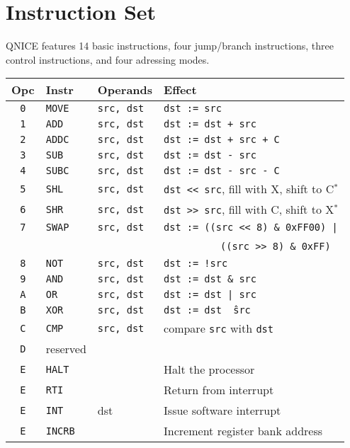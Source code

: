 \documentclass{leaflet}
\begin{document}
 \section{Instruction Set}
  QNICE features 14 basic instructions, four jump/branch instructions, three
  control instructions, and four adressing modes.
  \vspace*{-3mm}
  {\scriptsize
   \begin{center}
    \begin{longtable}{|c|ll|l|}
     \hline
      $\!\!\!$Opc$\!\!\!$&Instr&Operands&Effect\\
     \hline
     \hline
      {\tt 0}&{\tt MOVE}&{\tt src, dst}&{\tt dst := src}\\
      {\tt 1}&{\tt ADD}&{\tt src, dst}&{\tt dst := dst + src}\\
      {\tt 2}&{\tt ADDC}&{\tt src, dst}&{\tt dst := dst + src + C}\\
      {\tt 3}&{\tt SUB}&{\tt src, dst}&{\tt dst := dst - src}\\
      {\tt 4}&{\tt SUBC}&{\tt src, dst}&{\tt dst := dst - src - C}\\
      {\tt 5}&{\tt SHL}&{\tt src, dst}&{\tt dst << src}, fill with X, shift to C$^*$\\
      {\tt 6}&{\tt SHR}&{\tt src, dst}&{\tt dst >> src}, fill with C, shift to X$^*$\\
      {\tt 7}&{\tt SWAP}&{\tt src, dst}&{\tt dst := ((src << 8) \& 0xFF00) |}\\
             &          &              &~~~~~~~~~~{\tt ((src >> 8) \& 0xFF)}\\
      {\tt 8}&{\tt NOT}&{\tt src, dst}&{\tt dst := !src}\\
      {\tt 9}&{\tt AND}&{\tt src, dst}&{\tt dst := dst \& src}\\
      {\tt A}&{\tt OR}&{\tt src, dst}&{\tt dst := dst | src}\\
      {\tt B}&{\tt XOR}&{\tt src, dst}&{\tt dst := dst \^\ src}\\
      {\tt C}&{\tt CMP}&{\tt src, dst}&compare {\tt src} with {\tt dst}\\
      {\tt D}&reserved&&\\
      {\tt E}&{\tt HALT}&&Halt the processor\\
      {\tt E}&{\tt RTI}&&Return from interrupt\\
      {\tt E}&{\tt INT}&dst&Issue software interrupt\\
      {\tt E}&{\tt INCRB}&&Increment register bank address\\

\end{longtable}
\end{center}}
\end{document}
